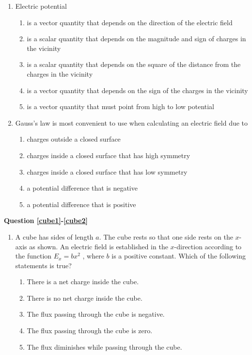 \documentclass{../../../oss-apphys}
\begin{document}
\begin{multicols}{2}
\begin{enumerate}[leftmargin=18pt]
  \item Electric potential
    \begin{enumerate}[nosep,leftmargin=18pt,label=(\Alph*)]
    \item is a vector quantity that depends on the direction of the electric
      field
    \item is a scalar quantity that depends on the magnitude and sign of charges
      in the vicinity
    \item is a scalar quantity that depends on the square of the distance from
      the charges in the vicinity
    \item is a vector quantity that depends on the sign of the charges in the
      vicinity
    \item is a vector quantity that must point from high to low potential
    \end{enumerate}

  \item Gauss's law is most convenient to use when calculating an electric field
    due to
    \begin{enumerate}[nosep,leftmargin=18pt,label=(\Alph*)]
    \item charges outside a closed surface
    \item charges inside a closed surface that has high symmetry
    \item charges inside a closed surface that has low symmetry
    \item a potential difference that is negative
    \item a potential difference that is positive
    \end{enumerate}  
  \end{enumerate}
  \columnbreak
  
  \textbf{Question \ref{cube1}-\ref{cube2}}
  \begin{enumerate}[leftmargin=18pt,resume]
  \item A cube has sides of length $a$. The cube rests so that one side rests on
    the $x$-axis as shown. An electric field is established in the $x$-direction
    according to the function $E_x=bx^2$ , where $b$ is a positive constant.
    Which of the following statements is true?
    \label{cube1}
    \vspace{-.15in}
    \begin{enumerate}[nosep,leftmargin=18pt,label=(\Alph*)]
    \item\vspace{-.2in}There is a net charge inside the cube.
    \item There is no net charge inside the cube.
    \item The flux passing through the cube is negative.
    \item The flux passing through the cube is zero.
    \item The flux diminishes while passing through the cube.
    \end{enumerate}


\end{enumerate}
\end{multicols}
\end{document}
